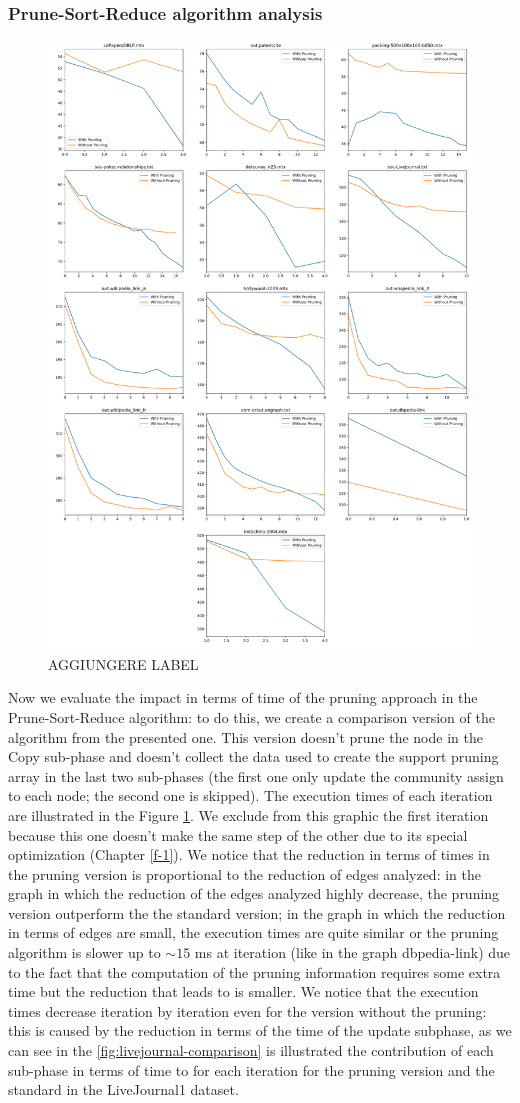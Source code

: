 \subsubsection{Prune-Sort-Reduce algorithm analysis}
\begin{figure}[h]
	\centering
	\includegraphics[width=0.7\linewidth]{0-resources/sort-prune-vs-no-prune}
	\caption{AGGIUNGERE LABEL}
	\label{fig:prun-vs-no}
\end{figure}
Now we evaluate the impact in terms of time of the pruning approach in the Prune-Sort-Reduce algorithm: to do this, we create a comparison version of the algorithm from the presented one. This version doesn't prune the node in the Copy sub-phase and doesn't collect the data used to create the support pruning array in the last two sub-phases (the first one only update the community assign to each node; the second one is skipped). The execution times of each iteration are illustrated in the Figure \ref{fig:prun-vs-no}. We exclude from this graphic the first iteration because this one doesn't make the same step of the other due to its special optimization (Chapter \ref{f-1}). We notice that the reduction in terms of times in the pruning version is proportional to the reduction of edges analyzed: in the graph in which the reduction of the edges analyzed highly decrease, the pruning version outperform the the standard version; in the graph in which the reduction in terms of edges are small, the execution times are quite similar or the pruning algorithm is slower up to $\sim15$ ms at iteration (like in the graph dbpedia-link) due to the fact that the computation of the pruning information requires some extra time but the reduction that leads to is smaller. We notice that the execution times decrease iteration by iteration even for the version without the pruning: this is caused by the reduction in terms of the time of the update subphase, as we can see in the \ref{fig:livejournal-comparison} is illustrated the contribution of each sub-phase in terms of time to for each iteration for the pruning version and the standard in the LiveJournal1 dataset.
